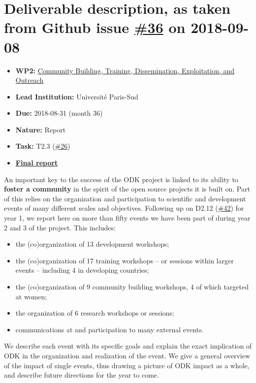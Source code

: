 \section*{\texorpdfstring{Deliverable description, as taken from Github
issue
\href{https://github.com/OpenDreamKit/OpenDreamKit/issues/36}{\#36} on
2018-09-08}{Deliverable description, as taken from Github issue \#36 on 2018-09-08}}\label{deliverable-description-as-taken-from-github-issue-36-on-2018-09-08}

\begin{itemize}
\tightlist
\item
  \textbf{WP2:}
  \href{https://github.com/OpenDreamKit/OpenDreamKit/tree/master/WP2}{Community
  Building, Training, Dissemination, Exploitation, and Outreach}
\item
  \textbf{Lead Institution:} Université Paris-Sud
\item
  \textbf{Due:} 2018-08-31 (month 36)
\item
  \textbf{Nature:} Report
\item
  \textbf{Task:} T2.3
  (\href{https://github.com/OpenDreamKit/OpenDreamKit/issues/26}{\#26})
\item
  \textbf{\href{https://github.com/OpenDreamKit/OpenDreamKit/raw/master/WP2/D2.11/report-final.pdf}{Final
  report}}
\end{itemize}

An important key to the success of the ODK project is linked to its
ability to \textbf{foster a community} in the spirit of the open source
projects it is built on. Part of this relies on the organization and
participation to scientific and development events of many different
scales and objectives. Following up on D2.12
(\href{https://github.com/OpenDreamKit/OpenDreamKit/issues/42}{\#42})
for year 1, we report here on more than fifty events we have been part
of during year 2 and 3 of the project. This includes:

\begin{itemize}
\tightlist
\item
  the (co)organization of 13 development workshops;
\item
  the (co)organization of 17 training workshops -- or sessions within
  larger events -- including 4 in developing countries;
\item
  the (co)organization of 9 community building workshops, 4 of which
  targeted at women;
\item
  the organization of 6 research workshops or sessions;
\item
  communications at and participation to many external events.
\end{itemize}

We describe each event with its specific goals and explain the exact
implication of ODK in the organization and realization of the event. We
give a general overview of the impact of single events, thus drawing a
picture of ODK impact as a whole, and describe future directions for the
year to come.
